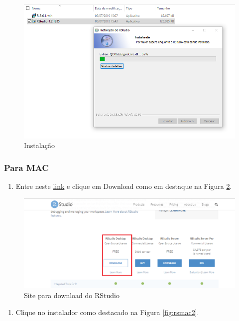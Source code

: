 \documentclass[
]{book}
\providecommand{\tightlist}{%
  \setlength{\itemsep}{0pt}\setlength{\parskip}{0pt}}
\begin{document}
\begin{figure}
\includegraphics[width=1\linewidth]{figures/install_Rstudio7} \caption{\label{fig:rswindows7} Instalação}\label{fig:rswindows7}
\end{figure}

\hypertarget{para-mac-1}{%
\subsubsection{Para MAC}\label{para-mac-1}}

\begin{enumerate}
\def\labelenumi{\arabic{enumi})}
\tightlist
\item
  Entre neste \href{https://www.rstudio.com/products/rstudio/download/}{link} e clique em Download como em destaque na Figura \ref{fig:rsmac1}.
\end{enumerate}

\begin{figure}
\includegraphics[width=1\linewidth]{figures/install_Rstudio1} \caption{\label{fig:rsmac1}Site para download do RStudio}\label{fig:rsmac1}
\end{figure}

\begin{enumerate}
\def\labelenumi{\arabic{enumi})}
\setcounter{enumi}{1}
\tightlist
\item
  Clique no instalador como destacado na Figura \ref{fig:rsmac2}.
\end{enumerate}
\end{document}
